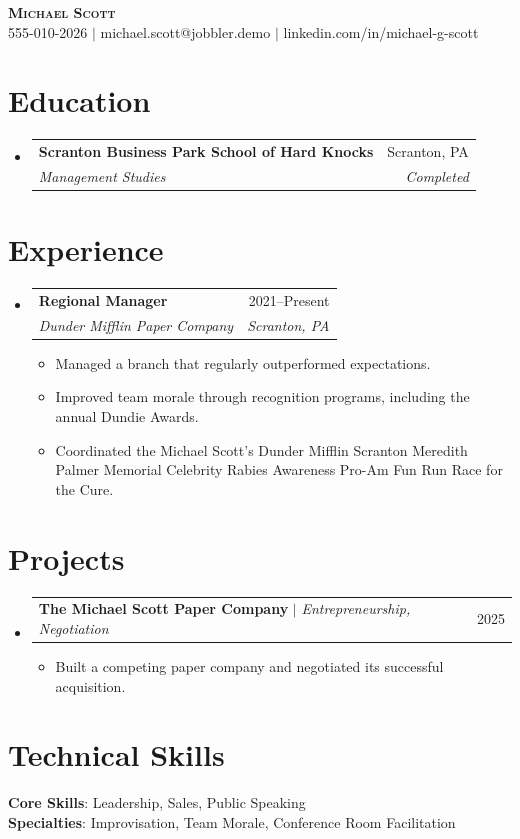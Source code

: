 \documentclass[letterpaper,11pt]{article}
\makeatletter
\newcommand{\resumeItem}[1]{\item\small{{#1 \vspace{-2pt}}}}
\newcommand{\resumeSubheading}[4]{\vspace{-2pt}\item\begin{tabular*}{0.97\textwidth}[t]{l@{\extracolsep{\fill}}r}\textbf{#1} & #2 \\ \textit{\small#3} & \textit{\small #4} \\ \end{tabular*}\vspace{-7pt}}
\newcommand{\resumeProjectHeading}[2]{\item\begin{tabular*}{0.97\textwidth}{l@{\extracolsep{\fill}}r}\small#1 & #2 \\ \end{tabular*}\vspace{-7pt}}
\newcommand{\resumeSubHeadingListStart}{\begin{itemize}[leftmargin=0.15in, label={}]}
\newcommand{\resumeSubHeadingListEnd}{\end{itemize}}
\newcommand{\resumeItemListStart}{\begin{itemize}}
\newcommand{\resumeItemListEnd}{\end{itemize}\vspace{-5pt}}
\makeatother
\begin{document}
\begin{center}
\textbf{\Huge \scshape Michael Scott} \\ \vspace{1pt}
\small 555-010-2026 $|$ michael.scott@jobbler.demo $|$ linkedin.com/in/michael-g-scott
\end{center}

\section{Education}
\resumeSubHeadingListStart
\resumeSubheading{Scranton Business Park School of Hard Knocks}{Scranton, PA}{Management Studies}{Completed}
\resumeSubHeadingListEnd

\section{Experience}
\resumeSubHeadingListStart
\resumeSubheading{Regional Manager}{2021--Present}{Dunder Mifflin Paper Company}{Scranton, PA}
\resumeItemListStart
\resumeItem{Managed a branch that regularly outperformed expectations.}
\resumeItem{Improved team morale through recognition programs, including the annual Dundie Awards.}
\resumeItem{Coordinated the Michael Scott's Dunder Mifflin Scranton Meredith Palmer Memorial Celebrity Rabies Awareness Pro-Am Fun Run Race for the Cure.}
\resumeItemListEnd
\resumeSubHeadingListEnd

\section{Projects}
\resumeSubHeadingListStart
\resumeProjectHeading{\textbf{The Michael Scott Paper Company} $|$ \emph{Entrepreneurship, Negotiation}}{2025}
\resumeItemListStart
\resumeItem{Built a competing paper company and negotiated its successful acquisition.}
\resumeItemListEnd
\resumeSubHeadingListEnd

\section{Technical Skills}
\begin{itemize}[leftmargin=0.15in, label={}]
\small{\item{
\textbf{Core Skills}{: Leadership, Sales, Public Speaking} \\
\textbf{Specialties}{: Improvisation, Team Morale, Conference Room Facilitation} \\
}}
\end{itemize}
\end{document}
